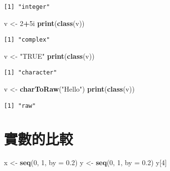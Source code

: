 \documentclass[]{book}
\newenvironment{Shaded}{\begin{snugshade}}{\end{snugshade}}
\newcommand{\DataTypeTok}[1]{\textcolor[rgb]{0.13,0.29,0.53}{#1}}
\newcommand{\DecValTok}[1]{\textcolor[rgb]{0.00,0.00,0.81}{#1}}
\newcommand{\FloatTok}[1]{\textcolor[rgb]{0.00,0.00,0.81}{#1}}
\newcommand{\KeywordTok}[1]{\textcolor[rgb]{0.13,0.29,0.53}{\textbf{#1}}}
\newcommand{\NormalTok}[1]{#1}
\newcommand{\OperatorTok}[1]{\textcolor[rgb]{0.81,0.36,0.00}{\textbf{#1}}}
\newcommand{\StringTok}[1]{\textcolor[rgb]{0.31,0.60,0.02}{#1}}
\theoremstyle{definition}
\theoremstyle{definition}
\theoremstyle{definition}
\theoremstyle{remark}
\begin{document}
\begin{verbatim}
[1] "integer"
\end{verbatim}

\begin{Shaded}
\begin{Highlighting}[]
\NormalTok{v <-}\StringTok{ }\DecValTok{2}\OperatorTok{+}\NormalTok{5i}
\KeywordTok{print}\NormalTok{(}\KeywordTok{class}\NormalTok{(v))}
\end{Highlighting}
\end{Shaded}

\begin{verbatim}
[1] "complex"
\end{verbatim}

\begin{Shaded}
\begin{Highlighting}[]
\NormalTok{v <-}\StringTok{ "TRUE"}
\KeywordTok{print}\NormalTok{(}\KeywordTok{class}\NormalTok{(v))}
\end{Highlighting}
\end{Shaded}

\begin{verbatim}
[1] "character"
\end{verbatim}

\begin{Shaded}
\begin{Highlighting}[]
\NormalTok{v <-}\StringTok{ }\KeywordTok{charToRaw}\NormalTok{(}\StringTok{"Hello"}\NormalTok{)}
\KeywordTok{print}\NormalTok{(}\KeywordTok{class}\NormalTok{(v))}
\end{Highlighting}
\end{Shaded}

\begin{verbatim}
[1] "raw"
\end{verbatim}

\section{實數的比較}

\begin{Shaded}
\begin{Highlighting}[]
\NormalTok{x <-}\StringTok{ }\KeywordTok{seq}\NormalTok{(}\DecValTok{0}\NormalTok{, }\DecValTok{1}\NormalTok{, }\DataTypeTok{by =} \FloatTok{0.2}\NormalTok{)}
\NormalTok{y <-}\StringTok{ }\KeywordTok{seq}\NormalTok{(}\DecValTok{0}\NormalTok{, }\DecValTok{1}\NormalTok{, }\DataTypeTok{by =} \FloatTok{0.2}\NormalTok{)}
\NormalTok{y[}\DecValTok{4}\NormalTok{]}
\end{Highlighting}
\end{Shaded}
\end{document}

